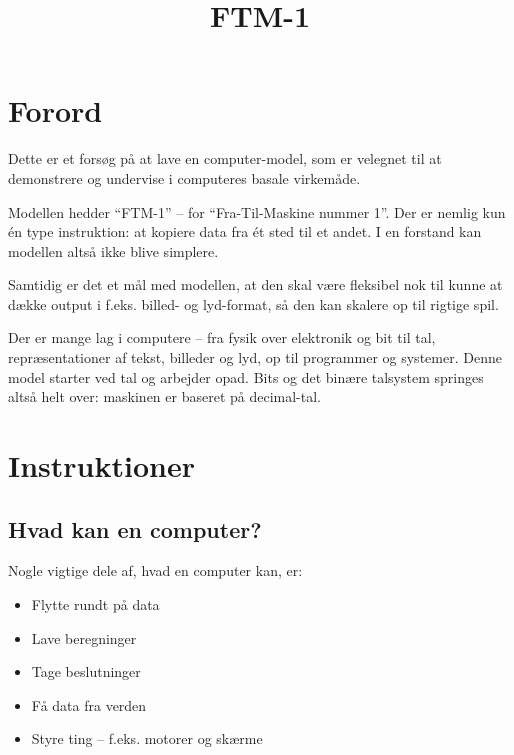 \documentclass[a4paper]{article}
\title{FTM-1}
\begin{document}
\maketitle

%

\section*{Forord}
Dette er et forsøg på at lave en computer-model, som er velegnet til at demonstrere og undervise i computeres basale virkemåde.

Modellen hedder ``FTM-1'' -- for ``Fra-Til-Maskine nummer 1''.
Der er nemlig kun én type instruktion: at kopiere data fra ét sted til et andet.
I en forstand kan modellen altså ikke blive simplere.

Samtidig er det et mål med modellen, at den skal være fleksibel nok til kunne at dække output i f.eks. billed- og lyd-format, så den kan skalere op til rigtige spil.
\medskip

Der er mange lag i computere -- fra fysik over elektronik og bit til
tal, repræsentationer af tekst, billeder og lyd, op til programmer og
systemer.
Denne model starter ved tal og arbejder opad. Bits og det binære
talsystem springes altså helt over: maskinen er baseret på decimal-tal.

\newpage

\section{Instruktioner}


\subsection*{Hvad kan en computer?}
Nogle vigtige dele af, hvad en computer kan, er:

\begin{itemize}\setlength\itemsep{0pt}
\item Flytte rundt på data
\item Lave beregninger
\item Tage beslutninger
\item Få data fra verden
\item Styre ting -- f.eks. motorer og skærme
\end{itemize}
\end{document}
